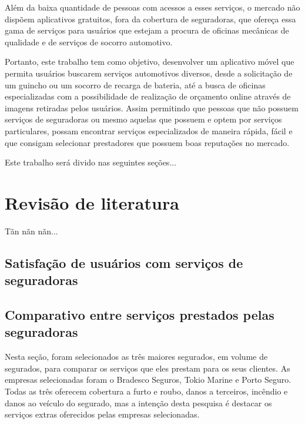 Além da baixa quantidade de pessoas com acessos a esses serviços, o mercado não dispõem aplicativos gratuitos, fora da cobertura de seguradoras, que ofereça essa gama de serviços para usuários que estejam a procura de oficinas mecânicas de qualidade e de serviços de socorro automotivo.

Portanto, este trabalho tem como objetivo, desenvolver um aplicativo móvel que permita usuários buscarem serviços automotivos diversos, desde a solicitação de um guincho ou um socorro de recarga de bateria, até a busca de oficinas especializadas com a possibilidade de realização de orçamento online através de imagens retiradas pelos usuários. Assim permitindo que pessoas que não possuem serviços de seguradoras ou mesmo aquelas que possuem e optem por serviços particulares, possam encontrar serviços especializados de maneira rápida, fácil e que consigam selecionar prestadores que possuem boas reputações no mercado.

Este trabalho será divido nas seguintes seções...



\section{\esp Revisão de literatura}

Tãn nãn nãn...

\subsection{\esp Satisfação de usuários com serviços de seguradoras}



\subsection{\esp }


\subsection{\esp Comparativo entre serviços prestados pelas seguradoras}

Nesta seção, foram selecionados as três maiores segurados, em volume de segurados, para comparar os serviços que eles prestam para os seus clientes. As empresas selecionadas foram o Bradesco Seguros, Tokio Marine e Porto Seguro. Todas as três oferecem cobertura a furto e roubo, danos a terceiros, incêndio e danos ao veículo do segurado, mas a intenção desta pesquisa é destacar os serviços extras oferecidos pelas empresas selecionadas.
\newline

